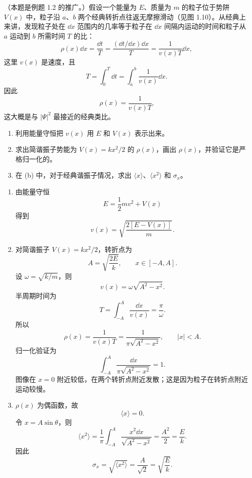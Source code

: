 \begin{question}
（本题是例题 1.2 的推广。）假设一个能量为 $E$、质量为 $m$ 的粒子位于势阱 $V(x)$ 中，粒子沿 $a$、$b$ 两个经典转折点往返无摩擦滑动（见图 1.10）。从经典上来讲，发现粒子处在 $\dd x$ 范围内的几率等于粒子在 $\dd x$ 间隔内运动的时间和粒子从 $a$ 运动到 $b$ 所需时间 $T$ 的比：
\[
\rho(x)\dd x=\frac{\dd t}{T}=\frac{(\dd t/\dd x)\dd x}{T}=\frac{1}{v(x)T}\dd x,
\tag{1.41}
\]
这里 $v(x)$ 是速度，且
\[
T=\int_0^T \dd t=\int_a^b \frac{1}{v(x)}\dd x.
\tag{1.42}
\]
因此
\[
\rho(x)=\frac{1}{v(x)T}.
\tag{1.43}
\]
这大概是与 $|\Psi|^2$ 最接近的经典类比。
\begin{enumerate}
\item 利用能量守恒把 $v(x)$ 用 $E$ 和 $V(x)$ 表示出来。
\item 求出简谐振子势能为 $V(x)=kx^2/2$ 的 $\rho(x)$，画出 $\rho(x)$，并验证它是严格归一化的。
\item 在 (b) 中，对于经典谐振子情况，求出 $\langle x\rangle$、$\langle x^2\rangle$ 和 $\sigma_x$。
\end{enumerate}
\end{question}
\begin{solution}
\begin{enumerate}
\item 由能量守恒
\[
E=\frac12mv^2+V(x)
\]
得到
\[
v(x)=\sqrt{\frac{2[E-V(x)]}{m}}.
\]
\item 对简谐振子 $V(x)=kx^2/2$，转折点为
\[
A=\sqrt{\frac{2E}{k}},\qquad x\in[-A,A].
\]
设 $\omega=\sqrt{k/m}$，则
\[
v(x)=\omega\sqrt{A^2-x^2}.
\]
半周期时间为
\[
T=\int_{-A}^{A}\frac{\dd x}{v(x)}=\frac{\pi}{\omega}.
\]
所以
\[
\rho(x)=\frac{1}{v(x)T}=\frac{1}{\pi\sqrt{A^2-x^2}},\qquad |x|<A.
\]
归一化验证为
\[
\int_{-A}^{A}\frac{\dd x}{\pi\sqrt{A^2-x^2}}=1.
\]
图像在 $x=0$ 附近较低，在两个转折点附近发散；这是因为粒子在转折点附近运动较慢。
\item $\rho(x)$ 为偶函数，故
\[
\langle x\rangle=0.
\]
令 $x=A\sin\theta$，则
\[
\langle x^2\rangle=\frac{1}{\pi}\int_{-A}^{A}\frac{x^2\dd x}{\sqrt{A^2-x^2}}
=\frac{A^2}{2}=\frac{E}{k}.
\]
因此
\[
\sigma_x=\sqrt{\langle x^2\rangle}=\frac{A}{\sqrt2}=\sqrt{\frac{E}{k}}.
\]
\end{enumerate}
\end{solution}

